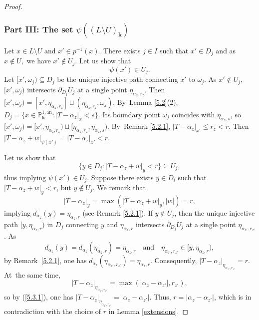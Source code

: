 \documentclass[10pt]{amsart}
\newcommand{\quand}{\quad\text{and}\quad}
\newcommand{\bbk}{{\boldsymbol{k}}}%
\let\backslash\setminus
\theoremstyle{definition}
\begin{document}
\begin{proof}
\subsubsection*{Part III: The set $\psi((L \backslash U)_{\bbk})$}
Let $x \in L \backslash U$ and $x' \in p^{-1}(x)$. There exists $j \in I$ such that $x' \in D_j$ and as $x \notin U, $ we have $x' \notin U_j$. Let us show that
\begin{equation} \label{5.5}
\psi(x') \in U_j.
\end{equation}
Let $[x', \omega_j) \subseteq D_j$ be the unique injective path connecting $x'$ to $\omega_j$. As $x' \notin U_j$, $[x', \omega_j)$ intersects $\partial_{D_j} U_j$ at a single point $\eta_{\alpha_z, r_z}$. Then $[x', \omega_j)=[x', \eta_{\alpha_{z}, r_z}] \sqcup (\eta_{\alpha_z, r_z}, \omega_j)$.
By~Lemma \ref{5.2}(2),
$D_j=\{x \in \mathbb{P}_{\bbk}^{1, \mathrm{an}}: |T-\alpha_z|_x <s\}$. Its boundary point $\omega_j$ coincides with $\eta_{\alpha_z, s}$, so $[x', \omega_j)=[x', \eta_{\alpha_z, r_z}) \sqcup [\eta_{\alpha_z, r_z}, \eta_{\alpha_z,s})$. By~Remark \ref{5.2.1}, $|T-\alpha_z|_{x'} \leqslant r_z <r$. Then
$|T-\alpha_z+w|_{\psi(x')}=|T-\alpha_z|_{x'} < r$.

Let us show that
\[
\{y \in D_{j}:|T-\alpha_z+w|_y < r\} \subseteq U_{j},
\]
thus implying $\psi(x') \in U_j$.
Suppose there exists $y \in D_i$ such that $|T-\alpha_z+w|_y < r$, but $y \notin U_j$.
We remark that
\[
|T-\alpha_z|_y=\max(|T-\alpha_z+w|_y, |w|)=r,
\]
implying $d_{\alpha_z}(y)=\eta_{\alpha_z, r}$ (see Remark \ref{5.2.1}). If ${y \notin U_j}$, then the unique injective path $[y, \eta_{\alpha_z, r})$ in $D_j$ connecting $y$ and $\eta_{\alpha_z,r}$ intersects $\partial_{D_j}U_j$ at a single point $\eta_{\alpha_{z'}, r_{z'}}$. As
\[
{d_{\alpha_z}(y)=d_{\alpha_z}(\eta_{\alpha_{z},r})=\eta_{\alpha_z, r}}\quand\eta_{\alpha_{z'}, r_{z'}} \in [y, \eta_{\alpha_z, r}),
\]
by Remark~\ref{5.2.1}, one has $d_{\alpha_z}(\eta_{\alpha_{z'}, r_{z'}})\!=\!\eta_{\alpha_z, r}$. Consequently, $|T-\alpha_z|_{\eta_{\alpha_{z'}, r_{z'}}}\!=\!r$. At~the same time,
\[
|T-\alpha_z|_{\eta_{\alpha_{z'}, r_{z'}}}=\max(|\alpha_z-\alpha_{z'}|,r_{z'}),
\]
so by (\ref{5.3.1}), one has $|T-\alpha_z|_{\eta_{\alpha_{z'}, r_{z'}}}=|\alpha_z-\alpha_{z'}|$. Thus, $r=|\alpha_z-\alpha_{z'}|$, which is in contradiction with the choice of $r$ in Lemma \ref{extensions}.


\end{proof}
\end{document}

